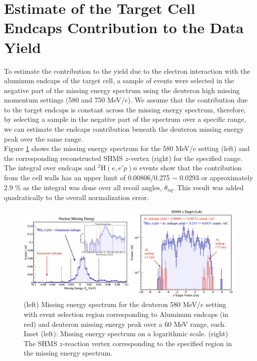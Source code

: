 \documentclass[aps, prl]{revtex4-2}  %
\begin{document}
\section{\large Estimate of the Target Cell Endcaps Contribution to the Data Yield}
\indent To estimate the contribution to the yield due to the electron interaction with the aluminum endcaps of the target cell,
a sample of events were selected in the negative part of the missing energy spectrum using the deuteron high missing momentum settings (580 and 750 MeV/c).
We assume that the contribution due to the target endcaps is constant across the missing energy spectrum, therefore, by selecting a sample in the
negative part of the spectrum over a specific range, we can estimate the endcaps contribution beneath the deuteron missing energy peak over the same range.\\
\indent Figure \ref{fig:tgt_wall} shows the missing energy spectrum for the 580 MeV/c setting (left) and the corresponding reconstructed SHMS $z$-vertex (right) for the specified
range. The integral over endcaps and $^{2}\mathrm{H}(e,e'p)n$ events show that the contribution from the cell walls has an upper limit of 0.00806/0.275 $\sim$ 0.0293 or approximately 2.9 $\%$
as the integral was done over all recoil angles, $\theta_{nq}$. This result was added quadratically to the overall normalization error.
\begin{figure}[!h]
\includegraphics[scale=0.33]{plots/tgt_bkg_d2_pm580_allthnq.png}
\caption{(left) Missing energy spectrum for the deuteron 580 MeV/c setting with event selection region corresponding to Aluminum endcaps (in red) and deuteron missing energy peak over
  a 60 MeV range, each.  Inset (left): Missing energy spectrum on a logarithmic scale. (right) The SHMS $z$-reaction vertex corresponding to
  the specified region in the missing energy spectrum.}
\label{fig:tgt_wall}
\end{figure}
\end{document}
